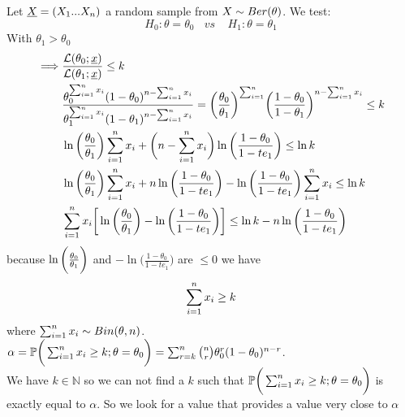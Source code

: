 \begin{eg}
		Let $\underline X=(X_1 ... X_n)$ a random sample from $X\sim Ber(\theta)$.
		 We test:
		$$H_0: \theta= \theta_0 \ \ \ \ vs\ \ \ \ \ H_1: \theta= \theta_1 $$
		With $\theta_1>\theta_0$
		\[
			\begin{split}
		\implies & \frac{\mathcal{L}(\theta_0;\underline x)}{\mathcal{L}(\theta_1;\underline x)}\leq k\\
		&\frac{\theta_0^{\sum_{i=1}^n x_i}(1-\theta_0)^{n-\sum_{i=1}^n x_i}}{\theta_1^{\sum_{i=1}^n x_i}(1-\theta_1)^{n-\sum_{i=1}^n x_i}}=\bigg( \frac{\theta_0}{\theta_1} \bigg)^{\sum_{i=1}^n} \bigg(  \frac{1-\theta_0}{1-\theta_1} \bigg)^{n-\sum_{i=1}^n x_i}\leq k\\
		& \ln\bigg(\frac{\theta_0}{\theta_1}\bigg)\sum_{i=1}^n x_i + \bigg(n-\sum_{i=1}^n x_i\bigg)\ln\bigg(\frac{1-\theta_0}{1-te_1}\bigg)\leq \ln k\\
		&\ln\bigg(\frac{\theta_0}{\theta_1}\bigg)\sum_{i=1}^n x_i + n \ln\bigg( \frac{1-\theta_0}{1-te_1} \bigg)-\ln\bigg(\frac{1-\theta_0}{1-te_1}\bigg)\sum_{i=1}^n x_i\leq \ln k\\
		&\sum_{i=1}^n x_i \bigg[ \ln\bigg(\frac{\theta_0}{\theta_1}\bigg)   -\ln\bigg(\frac{1-\theta_0}{1-te_1}\bigg) \bigg]	\leq \ln k - n \ln\bigg( \frac{1-\theta_0}{1-te_1} \bigg)	
			\end{split}
		\]
		because $ \ln\bigg(\frac{\theta_0}{\theta_1}\bigg)$   and $ -\ln\bigg(\frac{1-\theta_0}{1-te_1}\bigg)$ are $\leq 0$ we have
		$$\sum_{i=1}^n x_i\geq k$$
		where $\sum_{i=1}^n x_i \sim Bin(\theta, n)$.\\
		$\alpha =\mathbb{P} \bigg( \sum_{i=1}^n x_i \geq k ; \theta =\theta_0 \bigg)=\sum_{r=k}^n \binom{n}{r} \theta_0^r (1-\theta_0)^{n-r}$.\\
		We have $k\in \mathbb{N}$ so we can not find a  $k$ such that $\mathbb{P} \bigg( \sum_{i=1}^n x_i \geq k ; \theta =\theta_0 \bigg)$ is exactly equal to $\alpha$. So we look for a value that provides a value very close to $\alpha$
\end{eg}

